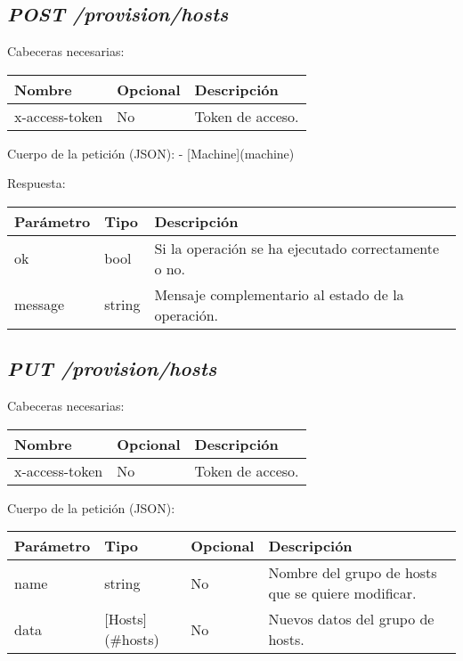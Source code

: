 \subsection{\textit{POST /provision/hosts}}

Cabeceras necesarias:
\begin{table}[h!]
	\centering
	\begin{adjustbox}{max width=\textwidth}
	\begin{tabular}{|l|l|l|}
		\hline
		Nombre & Opcional & Descripción \\ \hline
		x-access-token & No & Token de acceso. \\ \hline
	\end{tabular}
\end{adjustbox}
\end{table}

Cuerpo de la petición (JSON):
- [Machine](machine)

Respuesta:
\begin{table}[!h]
	\centering
	\begin{adjustbox}{max width=\textwidth}
	\begin{tabular}{|l|l|l|}
		\hline
		Parámetro & Tipo & Descripción \\ \hline
		ok & bool & Si la operación se ha ejecutado correctamente o no. \\ \hline
		message & string & Mensaje complementario al estado de la operación. \\ \hline
	\end{tabular}
\end{adjustbox}
\end{table}


\subsection{\textit{PUT /provision/hosts}}

Cabeceras necesarias:
\begin{table}[h!]
	\centering
	\begin{adjustbox}{max width=\textwidth}
	\begin{tabular}{|l|l|l|}
		\hline
		Nombre & Opcional & Descripción \\ \hline
		x-access-token & No & Token de acceso. \\ \hline
	\end{tabular}
\end{adjustbox}
\end{table}

Cuerpo de la petición (JSON):
\begin{table}[!h]
	\centering
	\begin{adjustbox}{max width=\textwidth}
	\begin{tabular}{|l|l|l|l|}
		\hline
		Parámetro & Tipo & Opcional & Descripción \\ \hline
		name & string & No & Nombre del grupo de hosts que se quiere modificar. \\ \hline
		data & [Hosts](\#hosts) & No & Nuevos datos del grupo de hosts. \\ \hline
	\end{tabular}
\end{adjustbox}
\end{table}


